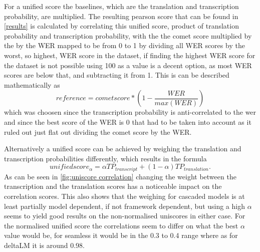 For a unified score the baselines, which are the translation and transcription probability, are multiplied. 
The resulting pearson score that can be found in \autoref{results} is calculated by correlating this unified score, product of translation probability and transcription probability, with the the comet score multiplied by the by the WER mapped to be from 0 to 1 by dividing all WER scores by the worst, so highest, WER score in the dataset, if finding the highest WER score for the dataset is not possible using 100 as a value is a decent option, as most WER scores are below that, and subtracting it from 1. 
This is can be described mathematically as 
$$reference = cometscore*(1-\frac{WER}{max(WER)})$$
which was choosen since the transcription probability is anti-correlated to the wer and since the best score of the WER is 0 that had to be taken into account as it ruled out just flat out dividing the comet score by the WER.

Alternatively a unified score can be achieved by weighing the translation and transcription probabilities differently, which results in the formula $$unifiedscore_\alpha= \alpha TP_{transcript} + (1-\alpha)TP_{translation}.$$ 
As can be seen in \autoref{fig:uniscore correlation} changing the weight between the transcription and the translation scores has a noticeable impact on the correlation scores. 
This also shows that the weighing for cascaded models is at least partially model dependent, if not framework dependent, but using a high $\alpha$ seems to yield good results on the non-normalised uniscores in either case. 
For the normalised unified score the correlations seem to differ on what the best $\alpha$ value would be, for seamless it would be in the 0.3 to 0.4 range where as for deltaLM it is around 0.98. 

